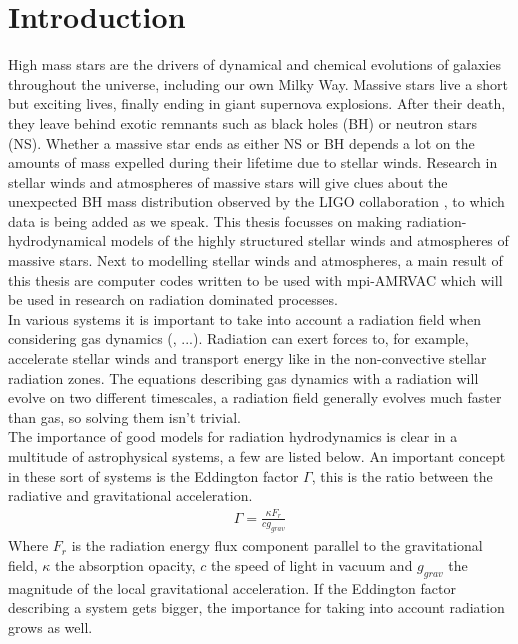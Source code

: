 \chapter{Introduction}
High mass stars are the drivers of dynamical and chemical evolutions of galaxies throughout the universe, including our own Milky Way. Massive stars live a short but exciting lives, finally ending in giant supernova explosions. After their death, they leave behind exotic remnants such as black holes (BH) or neutron stars (NS). Whether a massive star ends as either NS or BH depends a lot on the amounts of mass expelled during their lifetime due to stellar winds. Research in stellar winds and atmospheres of massive stars will give clues about the unexpected BH mass distribution observed by the LIGO collaboration \cite{Abbott1}, to which data is being added as we speak. This thesis focusses on making radiation-hydrodynamical models of the highly structured stellar winds and atmospheres of massive stars. Next to modelling stellar winds and atmospheres, a main result of this thesis are computer codes written to be used with mpi-AMRVAC which will be used in research on radiation dominated processes.\\

In various systems it is important to take into account a radiation field when considering gas dynamics (\cite{Tetsu2016},  ...). Radiation can exert forces to, for example, accelerate stellar winds and transport energy like in the non-convective stellar radiation zones. The equations describing gas dynamics with a radiation will evolve on two different timescales, a radiation field generally evolves much faster than gas, so solving them isn't trivial. \\

The importance of good models for radiation hydrodynamics is clear in a multitude of astrophysical systems, a few are listed below. An important concept in these sort of systems is the Eddington factor $\Gamma$, this is the ratio between the radiative and gravitational acceleration.
\begin{align}
	\Gamma = \frac{\kappa F_r}{c g_{grav}}
\end{align}
Where $F_r$ is the radiation energy flux component parallel to the gravitational field, $\kappa$ the absorption opacity, $c$ the speed of light in vacuum and $g_{grav}$ the magnitude of the local gravitational acceleration. If the Eddington factor describing a system gets bigger, the importance for taking into account radiation grows as well.

